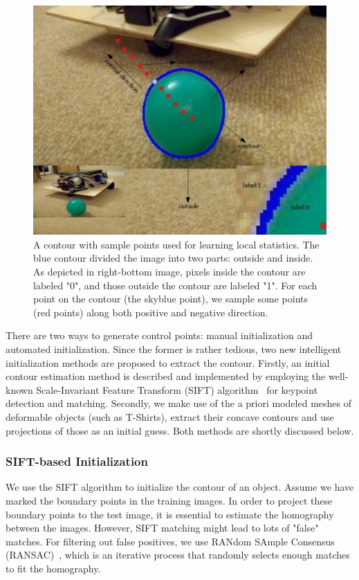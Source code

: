\documentclass[conference]{IEEEtran}
\begin{document}
\begin{figure}[htb]
  \centering
  \includegraphics[width=\columnwidth]{images/cont.jpg}
\caption{A contour with sample points used for learning local statistics. The blue contour
  divided the image into two parts: outside and inside. As depicted in
  right-bottom image, pixels inside the contour are labeled "0",
  and those outside the contour are labeled "1". For each point on the
  contour (the skyblue point), we sample some points (red points) along both positive
  and negative direction.}
\label{fig:prior}
\end{figure}

There are two ways to generate control points:
manual initialization and automated initialization. 
Since the former is rather tedious, two new
intelligent initialization methods are proposed to extract the
contour. Firstly, an initial contour estimation method is described and
implemented by employing the well-known Scale-Invariant Feature Transform 
(SIFT) algorithm~\cite{lowe2004distinctive} for
keypoint detection and matching. Secondly, we make use of the a priori
modeled meshes of deformable objects (such as T-Shirts), extract their
concave contours and use projections of those as an initial guess. Both 
methods are shortly discussed below.

\subsubsection{SIFT-based Initialization}
\label{sec:sift}
We use the SIFT algorithm to initialize the
contour of an object. Assume we have marked the boundary points in the
training images. In order to project these boundary points to the test
image, it is essential to estimate the homography between the
images. However, SIFT matching might lead to lots of "false" matches.
For filtering out false positives, we use RANdom SAmple Consensus (RANSAC)~\cite{fischler1981random}, 
which is an iterative process that randomly selects enough matches to fit the
homography.
\end{document}
